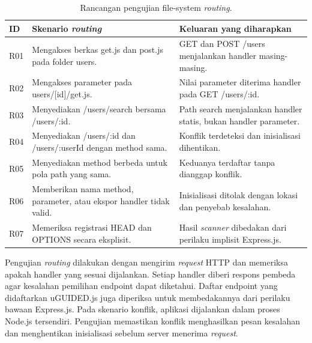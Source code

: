 \documentclass[12pt,a4paper,oneside]{report}
\begin{document}
\begin{table}[!htbp]
\centering\singlespacing\small
\begin{tabularx}{\textwidth}{@{}l >{\raggedright\arraybackslash}X >{\raggedright\arraybackslash}X@{}}
\toprule
\textbf{ID} & \textbf{Skenario \textit{routing}} & \textbf{Keluaran yang diharapkan} \\
\midrule
R01 & Mengakses berkas get.js dan post.js pada folder users. & GET dan POST /users menjalankan handler masing-masing. \\
R02 & Mengakses parameter pada users/[id]/get.js. & Nilai parameter diterima handler pada GET /users/:id. \\
R03 & Menyediakan /users/search bersama /users/:id. & Path search menjalankan handler statis, bukan handler parameter. \\
R04 & Menyediakan /users/:id dan /users/:userId dengan method sama. & Konflik terdeteksi dan inisialisasi dihentikan. \\
R05 & Menyediakan method berbeda untuk pola path yang sama. & Keduanya terdaftar tanpa dianggap konflik. \\
R06 & Memberikan nama method, parameter, atau ekspor handler tidak valid. & Inisialisasi ditolak dengan lokasi dan penyebab kesalahan. \\
R07 & Memeriksa registrasi HEAD dan OPTIONS secara eksplisit. & Hasil \textit{scanner} dibedakan dari perilaku implisit Express.js. \\
\bottomrule
\end{tabularx}
\caption{Rancangan pengujian file-system \textit{routing}.}
\label{tab:uji_routing}
\end{table}
\FloatBarrier

Pengujian \textit{routing} dilakukan dengan mengirim \textit{request} HTTP dan memeriksa apakah handler yang sesuai dijalankan. Setiap handler diberi respons pembeda agar kesalahan pemilihan endpoint dapat diketahui. Daftar endpoint yang didaftarkan uGUIDED.js juga diperiksa untuk membedakannya dari perilaku bawaan Express.js. Pada skenario konflik, aplikasi dijalankan dalam proses Node.js tersendiri. Pengujian memastikan konflik menghasilkan pesan kesalahan dan menghentikan inisialisasi sebelum server menerima \textit{request}.
\end{document}
